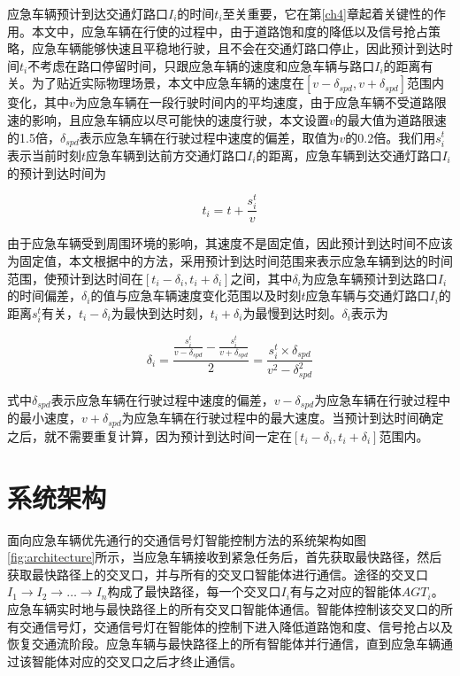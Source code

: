 应急车辆预计到达交通灯路口${I_i}$的时间${t_i}$至关重要，它在第\ref{ch4}章起着关键性的作用。本文中，应急车辆在行使的过程中，由于道路饱和度的降低以及信号抢占策略，应急车辆能够快速且平稳地行驶，且不会在交通灯路口停止，因此预计到达时间${t_i}$不考虑在路口停留时间，只跟应急车辆的速度和应急车辆与路口${I_i}$的距离有关。为了贴近实际物理场景，本文中应急车辆的速度在${[v-\delta_{spd}, v+\delta_{spd}]}$范围内变化，其中${v}$为应急车辆在一段行驶时间内的平均速度，由于应急车辆不受道路限速的影响，且应急车辆应以尽可能快的速度行驶，本文设置${v}$的最大值为道路限速的1.5倍，${\delta_{spd}}$表示应急车辆在行驶过程中速度的偏差，取值为${v}$的0.2倍。我们用${s_i^t}$表示当前时刻${t}$应急车辆到达前方交通灯路口${I_i}$的距离，应急车辆到达交通灯路口${I_i}$的预计到达时间为

\begin{equation}
	t_i= t + \frac{s_i^t}{v} 
	\label{equation:t_i}
\end{equation}

由于应急车辆受到周围环境的影响，其速度不是固定值，因此预计到达时间不应该为固定值，本文根据\cite{min}中的方法，采用预计到达时间范围来表示应急车辆到达的时间范围，使预计到达时间在${[t_i-\delta_i, t_i+\delta_i]}$之间，其中${\delta_i}$为应急车辆预计到达路口${I_i}$的时间偏差，${\delta_i}$的值与应急车辆速度变化范围以及时刻${t}$应急车辆与交通灯路口${I_i}$的距离${s_i^t}$有关，${t_i-\delta_i}$为最快到达时刻，${t_i+\delta_i}$为最慢到达时刻。${\delta_i}$表示为

\begin{equation}
	\delta_i=\frac{\frac{s_i^t}{v-\delta_{spd}}-\frac{s_i^t}{v+\delta_{spd}}}{2}=\frac{s_i^t\times\delta_{spd}}{v^2-\delta_{spd}^2}
	\label{equation:delta_i}
\end{equation}

式中${\delta_{spd}}$表示应急车辆在行驶过程中速度的偏差，${v-\delta_{spd}}$为应急车辆在行驶过程中的最小速度，${v+\delta_{spd}}$为应急车辆在行驶过程中的最大速度。当预计到达时间确定之后，就不需要重复计算，因为预计到达时间一定在${[t_i-\delta_i, t_i+\delta_i]}$范围内。

\section{系统架构}
面向应急车辆优先通行的交通信号灯智能控制方法的系统架构如图\ref{fig:architecture}所示，当应急车辆接收到紧急任务后，首先获取最快路径，然后获取最快路径上的交叉口，并与所有的交叉口智能体进行通信。途径的交叉口${I_1 \to I_2 \to \ldots \to I_n}$构成了最快路径，每一个交叉口${I_i}$有与之对应的智能体${AGT_i}$。应急车辆实时地与最快路径上的所有交叉口智能体通信。智能体控制该交叉口的所有交通信号灯，交通信号灯在智能体的控制下进入降低道路饱和度、信号抢占以及恢复交通流阶段。应急车辆与最快路径上的所有智能体并行通信，直到应急车辆通过该智能体对应的交叉口之后才终止通信。


